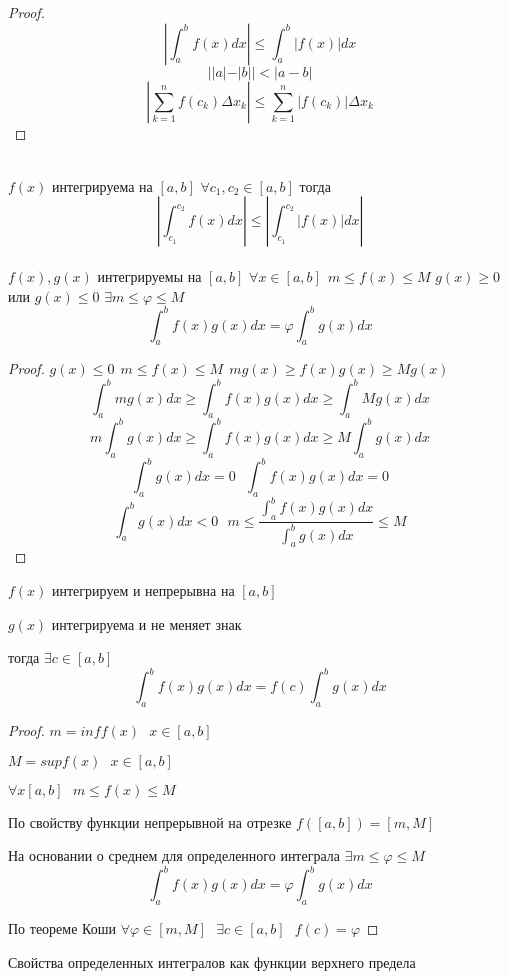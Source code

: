 \begin{proof}
  \[\left| \int_a^b f(x)dx \right| \le \int_a^b |f(x)|dx\]
  \[||a| - |b|| < |a - b|\]
  \[
      \left| \sum_{k=1}^n f(c_k)\Delta x_k \right| \le
      \sum_{k=1}^{n}|f(c_k)|\Delta x_k
  \]
\end{proof}
\\
$f(x)$ интегрируема на $[a, b]$ $\forall c_1, c_2 \in [a, b]$ тогда
\[
    \left| \int_{c_1}^{c_2} f(x)dx \right| \le
    \left| \int_{c_1}^{c_2} |f(x)|dx \right|
\]
\\
$f(x), g(x)$ интегрируемы на $[a, b]$ $\forall x \in [a, b] ~~
m \le f(x) \le M$ $g(x) \ge 0$ или $g(x) \le 0$ $\exists m \le \varphi \le M$
\[\int_a^b f(x)g(x)dx = \varphi \int_a^b g(x)dx\]
\begin{proof}
    $g(x) \le 0 ~~ m \le f(x) \le M ~~ mg(x) \ge f(x)g(x) \ge Mg(x)$
    \[\int_a^b mg(x)dx \ge \int_a^b f(x)g(x)dx \ge \int_a^b Mg(x)dx\]
    \[m\int_a^b g(x)dx \ge \int_a^b f(x)g(x)dx \ge M\int_a^b g(x)dx\]
    \[\int_a^b g(x)dx = 0 ~~~ \int_a^b f(x)g(x)dx = 0\]
    \[
    \int_a^b g(x)dx < 0 ~~~
    m \le \frac{\int_a^b f(x)g(x)dx}{\int_a^b g(x)dx} \le M
    \]
\end{proof}

\begin{theorem}
  $f(x)$ интегрируем и непрерывна на $[a,b]$

  $g(x)$ интегрируема и не меняет знак

  тогда $\exists c \in [a,b]$
  \[\int_a^b f(x)g(x)dx  = f(c) \int_a^b g(x)dx\]
\end{theorem}

\begin{proof}
  $m = inf f(x) ~~~ x \in [a,b]$

  $M = sup f(x) ~~~ x \in [a,b]$

  $\forall x [a,b] ~~~ m \le f(x) \le M$

  По свойству функции непрерывной на отрезке $f([a,b]) = [m, M]$

  На основании о среднем для определенного интеграла
  $\exists m \le \varphi \le M$
  $$
  \int_a^b f(x)g(x) dx = \varphi \int_a^b g(x) dx
  $$

  По теореме Коши $\forall \varphi \in [m,M] ~~~ \exists c \in [a,b] ~~~ f(c) =
  \varphi$
\end{proof}

\begin{title}[\Large]
  Свойства определенных интегралов как функции верхнего предела
\end{title}

